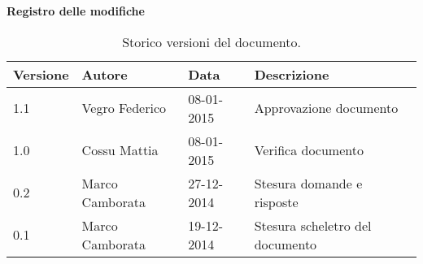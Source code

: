 \begin{Large}
	\textbf{Registro delle modifiche}
\end{Large}

\begin{table}[h]
\begin{center}
\begin{tabular}{|l|l|l|l|}
\hline
\textbf{Versione} & \textbf{Autore} & \textbf{Data} & \textbf{Descrizione} \\
\hline
1.1 & Vegro Federico & 08-01-2015 & Approvazione documento \\
\hline
1.0 & Cossu Mattia & 08-01-2015 & Verifica documento \\
\hline
0.2 & Marco Camborata & 27-12-2014 & Stesura domande e risposte \\
\hline
0.1 & Marco Camborata & 19-12-2014 & Stesura scheletro del documento \\
\hline
\end{tabular}
\caption{Storico versioni del documento.}
\end{center}
\end{table}
